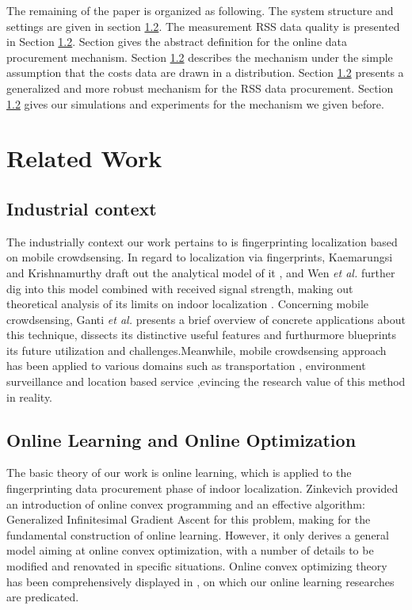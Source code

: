 \documentclass[10pt,conference,compsocconf,letterpaper]{IEEEtran}
\begin{document}
The remaining of the paper is organized as following. The system structure and settings are given in section \ref{}. The measurement  RSS data quality is presented in Section \ref{}. Section gives the abstract definition for the online data procurement mechanism. Section \ref{} describes the mechanism under the simple assumption that the costs data are drawn in a distribution. Section \ref{} presents a generalized and more robust mechanism for the RSS data procurement. Section \ref{} gives our simulations and experiments for the mechanism we given before.



\section{Related Work \label{sectionrelatedwork}}
\subsection{Industrial context}

The industrially context our work pertains to is fingerprinting localization based on mobile crowdsensing. In regard to localization via fingerprints, Kaemarungsi and Krishnamurthy draft out the analytical model of it \cite{kaemarungsi2004modeling}, and Wen \emph{et al.} \cite{}further dig into this model combined with received signal strength, making out theoretical analysis of its limits on indoor localization \cite{wen2015fundamental}. Concerning mobile crowdsensing, Ganti \emph{et al.} presents a brief overview of concrete applications about this technique, dissects its distinctive useful features and furthurmore blueprints its future utilization and challenges\cite{ganti2011mobile}.Meanwhile, mobile crowdsensing approach has been applied to various domains such as transportation \cite{transportation2}, environment surveillance \cite{environment,environment2} and location based service \cite{lbs, lbs2},evincing the research value of this method in reality.

\subsection{Online Learning and Online Optimization}

The basic theory of our work is online learning, which is applied to the fingerprinting data procurement phase of indoor localization. Zinkevich provided an introduction of online convex programming and an effective algorithm: Generalized Infinitesimal Gradient Ascent for this problem, making for the fundamental construction of online learning\cite{zinkevich2003online}. However, it only derives a general model aiming at online convex optimization, with a number of details to be modified and renovated in specific situations. Online convex optimizing theory has been comprehensively displayed in \cite{shalev2011online}, on which our online learning researches are predicated.
\end{document}
